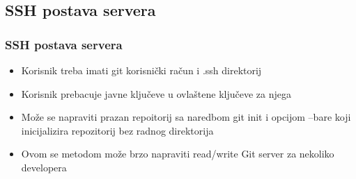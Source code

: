 \subsection{SSH postava servera}

\begin{frame}
\frametitle{SSH postava servera}
\begin{itemize}
	\item Korisnik treba imati git korisnički račun i .ssh direktorij
	\item Korisnik prebacuje javne ključeve u ovlaštene ključeve za njega
	\item Može se napraviti prazan repoitorij sa naredbom git init i opcijom --bare koji inicijalizira repozitorij bez radnog direktorija
	\item Ovom se metodom može brzo napraviti read/write Git server za nekoliko developera
\end{itemize}
\end{frame}